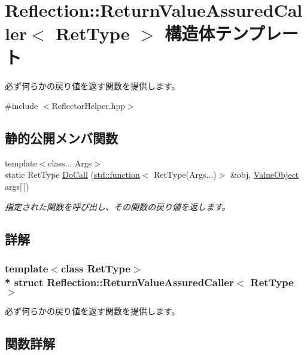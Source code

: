 \hypertarget{struct_reflection_1_1_return_value_assured_caller}{}\section{Reflection\+:\+:Return\+Value\+Assured\+Caller$<$ Ret\+Type $>$ 構造体テンプレート}
\label{struct_reflection_1_1_return_value_assured_caller}


必ず何らかの戻り値を返す関数を提供します。 




{\ttfamily \#include $<$Reflector\+Helper.\+hpp$>$}

\subsection*{静的公開メンバ関数}
\begin{DoxyCompactItemize}
\item 
{\footnotesize template$<$class... Args$>$ }\\static Ret\+Type \hyperlink{struct_reflection_1_1_return_value_assured_caller_a1ce408712c3891b311b179326ac59f9a}{Do\+Call} (\hyperlink{classstd_1_1function}{std\+::function}$<$ Ret\+Type(Args...)$>$ \&obj, \hyperlink{struct_reflection_1_1_value_object}{Value\+Object} args\mbox{[}$\,$\mbox{]})
\begin{DoxyCompactList}\small\item\em 指定された関数を呼び出し、その関数の戻り値を返します。\end{DoxyCompactList}\end{DoxyCompactItemize}


\subsection{詳解}
\subsubsection*{template$<$class Ret\+Type$>$\\*
struct Reflection\+::\+Return\+Value\+Assured\+Caller$<$ Ret\+Type $>$}

必ず何らかの戻り値を返す関数を提供します。



\subsection{関数詳解}
